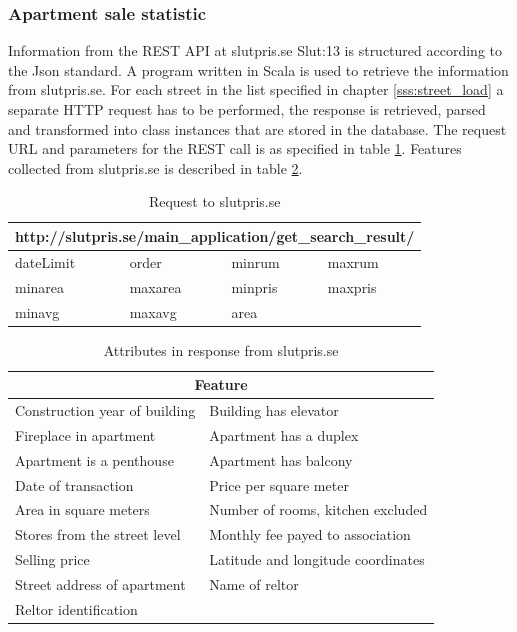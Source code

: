 \subsubsection{Apartment sale statistic} \label{sss:slutpris} %
Information from the REST API at slutpris.se \cite{dat}{Slut:13} is structured according to the Json standard. A program written in Scala is used to retrieve the information from slutpris.se. For each street in the list specified in chapter \ref{sss:street_load} a separate HTTP request has to be performed, the response is retrieved, parsed and transformed into class instances that are stored in the database. The request URL and parameters for the REST call is as specified in table \ref{tab:slutpris_se}. Features collected from slutpris.se is described in table \ref{tab:slutpris_se_result}. 

\begin{table}[H]
\centering
\begin{tabular}{ |p{2cm}|p{2cm}|p{2cm}|p{2cm}| } 
\hline
\multicolumn{4}{|c|}{http://slutpris.se/main\_application/get\_search\_result/} \\
\hline
dateLimit & order & minrum & maxrum \\
minarea & maxarea & minpris & maxpris \\
minavg & maxavg & area &  \\
\hline
\end{tabular}
\caption{Request to slutpris.se}
\label{tab:slutpris_se}
\end{table}


\begin{table}[H]
\begin{tabular}{ | p{5.6cm} | p{5.6cm} | } 
\hline 
\multicolumn{2}{|c|}{Feature} \\
\hline
Construction year of building & Building has elevator \\
Fireplace in apartment & Apartment has a duplex \\
Apartment is a penthouse & Apartment has balcony \\
Date of transaction & Price per square meter \\
Area in square meters & Number of rooms, kitchen excluded \\
Stores from the street level & Monthly fee payed to association \\
Selling price & Latitude and longitude coordinates \\
Street address of apartment & Name of reltor \\
Reltor identification &  \\
\hline
\end{tabular}
\caption{Attributes in response from slutpris.se}
\label{tab:slutpris_se_result}
\end{table}

